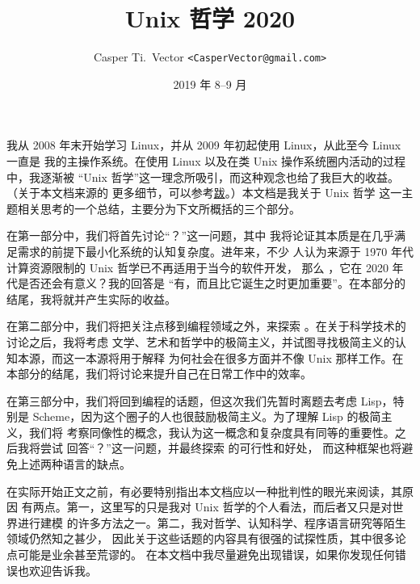 \documentclass[UTF8]{ctexart}
\begin{document}
\title{\textbf{Unix 哲学 2020}}
\author{Casper Ti.\ Vector \texttt{<CasperVector@gmail.com>}}
\date{2019 年 8--9 月}
\maketitle
\vspace{\baselineskip}
\tableofcontents


我从 2008 年末开始学习 Linux，并从 2009 年初起使用 Linux，从此至今 Linux 一直是
我的主操作系统。在使用 Linux 以及在类 Unix 操作系统圈内活动的过程中，我逐渐被
“Unix 哲学”这一理念所吸引，而这种观念也给了我巨大的收益。（关于本文档来源的
更多细节，可以参考\hyperref[sec:afterword]{跋}。）本文档是我关于 Unix 哲学
这一主题相关思考的一个总结，主要分为下文所概括的三个部分。

在第一部分中，我们将首先讨论“？”这一问题，其中
我将论证其本质是在几乎满足需求的前提下最小化系统的认知复杂度。进年来，不少
人认为来源于 1970 年代计算资源限制的 Unix 哲学已不再适用于当今的软件开发，
那么 ，它在 2020 年代是否还会有意义？我的回答是
“有，而且比它诞生之时更加重要”。在本部分的结尾，我将就并产生实际的收益。

在第二部分中，我们将把关注点移到编程领域之外，来探索 。在关于科学技术的讨论之后，我将考虑
文学、艺术和哲学中的极简主义，并试图寻找极简主义的认知本源，而这一本源将用于解释
为何社会在很多方面并不像 Unix 那样工作。在本部分的结尾，我们将讨论来提升自己在日常工作中的效率。

在第三部分中，我们将回到编程的话题，但这次我们先暂时离题去考虑 Lisp，特别是
Scheme，因为这个圈子的人也很鼓励极简主义。为了理解 Lisp 的极简主义，我们将
考察同像性的概念，我认为这一概念和复杂度具有同等的重要性。之后我将尝试
回答“？”这一问题，并最终探索%
的可行性和好处，
而这种框架也将避免上述两种语言的缺点。

在实际开始正文之前，有必要特别指出本文档应以一种批判性的眼光来阅读，其原因
有两点。第一，这里写的只是我对 Unix 哲学的个人看法，而后者又只是对世界进行建模
的许多方法之一。第二，我对哲学、认知科学、程序语言研究等陌生领域仍然知之甚少，
因此关于这些话题的内容具有很强的试探性质，其中很多论点可能是业余甚至荒谬的。
在本文档中我尽量避免出现错误，如果你发现任何错误也欢迎告诉我。
\end{document}
